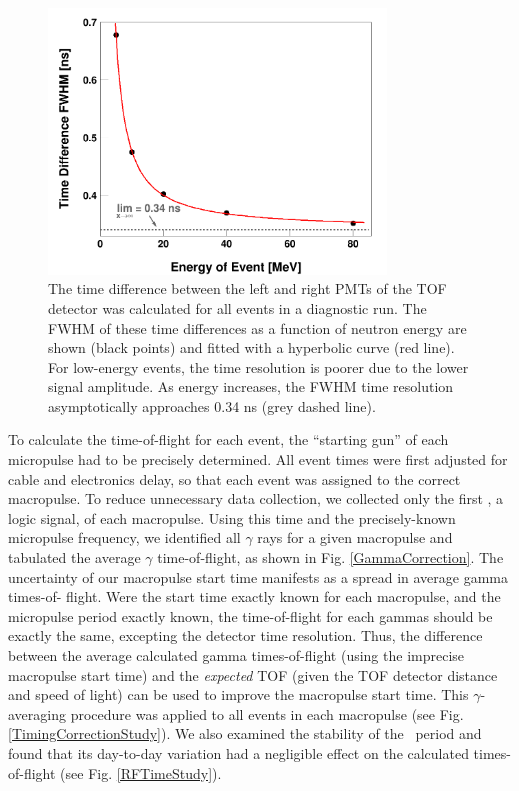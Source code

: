 \begin{figure}[h]
    \centering
    \includegraphics[width=0.8\textwidth]{figures/DifferenceThresholdsFit.png}
    \caption[Intrinsic time resolution of time-of-flight detector as a function
    of signal amplitude]
    {
        The time difference between the left and right PMTs
        of the TOF detector was calculated for all events in a diagnostic run.
        The FWHM of these time differences as a function of
        neutron energy are shown (black points) and fitted with a hyperbolic
        curve (red line). For low-energy
        events, the time resolution is poorer due to the lower signal amplitude.
        As energy increases, the FWHM time resolution asymptotically approaches 0.34
        ns (grey dashed line).
    }
    \label{DifferenceThresholdsFit}
\end{figure}

To calculate the time-of-flight for each event, the ``starting gun'' of each
micropulse had to be precisely determined. All event times were first adjusted for cable and 
electronics delay, so that each event was assigned to the correct macropulse.
To reduce unnecessary data collection, we collected only the first \tZero, a
logic signal, of each macropulse. 
Using this time and the precisely-known micropulse frequency, we identified all $\gamma$ rays 
for a given macropulse and tabulated
the average $\gamma$ time-of-flight, as shown in Fig. \ref{GammaCorrection}.
The uncertainty of our macropulse start time manifests as a spread in average gamma times-of-
flight. Were the start time exactly known for each macropulse, and the
micropulse period exactly known, the time-of-flight for each gammas should be
exactly the same, excepting the detector time resolution. Thus, the difference between the 
average calculated gamma times-of-flight (using the imprecise macropulse start
time) and the \textit{expected} TOF (given the TOF detector distance and speed of light)
can be used to improve the macropulse start time. This $\gamma$-averaging
procedure was applied to all events in each macropulse (see Fig.
\ref{TimingCorrectionStudy}). We also examined the stability of the \tZero\
period and found that its day-to-day variation had a negligible effect on the
calculated times-of-flight (see Fig. \ref{RFTimeStudy}).

